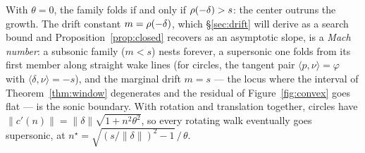 \begin{corollary}
\label{cor:mach}
With $\theta=0$, the family folds if and only if $\rho(-\delta)>s$: the center
outruns the growth. The drift constant $m=\rho(-\delta)$, which
\S\ref{sec:drift} will derive as a search bound and
Proposition~\ref{prop:closed} recovers as an asymptotic slope, is a
\emph{Mach number}: a subsonic family ($m<s$) nests forever, a supersonic one
folds from its first member along straight wake lines (for circles, the
tangent pair $\langle p,\nu\rangle=\varphi$ with
$\langle\delta,\nu\rangle=-s$), and the marginal drift $m=s$ --- the locus
where the interval of Theorem~\ref{thm:window} degenerates and the residual
of Figure~\ref{fig:convex} goes flat --- is the sonic boundary. With rotation
and translation together, circles have
$\lVert c'(n)\rVert=\lVert\delta\rVert\sqrt{1+n^2\theta^2}$, so every rotating
walk eventually goes supersonic, at
$n^\star=\sqrt{(s/\lVert\delta\rVert)^2-1}\,/\,\theta$.
\end{corollary}

